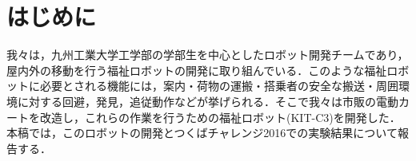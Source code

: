 \documentclass[10pt,a4paper]{jarticle}
\begin{document}
\section{はじめに}
\label{sec:intro}
我々は，九州工業大学工学部の学部生を中心としたロボット開発チームであり，屋内外の移動を行う福祉ロボットの開発に取り組んでいる．このような福祉ロボットに必要とされる機能には，案内・荷物の運搬・搭乗者の安全な搬送・周囲環境に対する回避，発見，追従動作などが挙げられる．そこで我々は市販の電動カートを改造し，これらの作業を行うための福祉ロボット(KIT-C3)を開発した．本稿では，このロボットの開発とつくばチャレンジ2016での実験結果について報告する．
\end{document}

